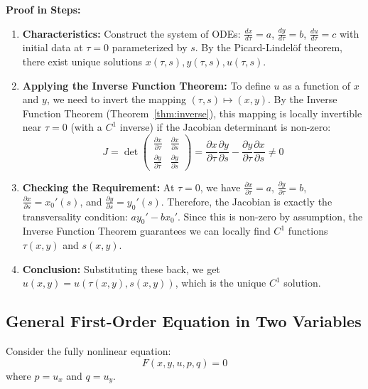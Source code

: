 \documentclass[11pt]{article}
\theoremstyle{plain}
\theoremstyle{definition}
\theoremstyle{remark}
\begin{document}
\textbf{Proof in Steps:}
\begin{enumerate}
    \item \textbf{Characteristics:} Construct the system of ODEs: $\frac{dx}{d\tau} = a$, $\frac{dy}{d\tau} = b$, $\frac{du}{d\tau} = c$ with initial data at $\tau=0$ parameterized by $s$. By the Picard-Lindel\"of theorem, there exist unique solutions $x(\tau,s), y(\tau,s), u(\tau,s)$.
    \item \textbf{Applying the Inverse Function Theorem:} To define $u$ as a function of $x$ and $y$, we need to invert the mapping $(\tau, s) \mapsto (x, y)$. By the Inverse Function Theorem (Theorem~\ref{thm:inverse}), this mapping is locally invertible near $\tau=0$ (with a $C^1$ inverse) if the Jacobian determinant is non-zero:
    $$ J = \det \begin{pmatrix} \frac{\partial x}{\partial \tau} & \frac{\partial x}{\partial s} \\ \frac{\partial y}{\partial \tau} & \frac{\partial y}{\partial s} \end{pmatrix} = \frac{\partial x}{\partial \tau} \frac{\partial y}{\partial s} - \frac{\partial y}{\partial \tau} \frac{\partial x}{\partial s} \neq 0 $$
    \item \textbf{Checking the Requirement:} At $\tau = 0$, we have $\frac{\partial x}{\partial \tau} = a$, $\frac{\partial y}{\partial \tau} = b$, $\frac{\partial x}{\partial s} = x_0'(s)$, and $\frac{\partial y}{\partial s} = y_0'(s)$. 
    Therefore, the Jacobian is exactly the transversality condition: $a y_0' - b x_0'$. Since this is non-zero by assumption, the Inverse Function Theorem guarantees we can locally find $C^1$ functions $\tau(x,y)$ and $s(x,y)$.
    \item \textbf{Conclusion:} Substituting these back, we get $u(x,y) = u(\tau(x,y), s(x,y))$, which is the unique $C^1$ solution.
\end{enumerate}

\subsection{General First-Order Equation in Two Variables}
Consider the fully nonlinear equation:
$$ F(x, y, u, p, q) = 0 $$
where $p = u_x$ and $q = u_y$.
\end{document}
